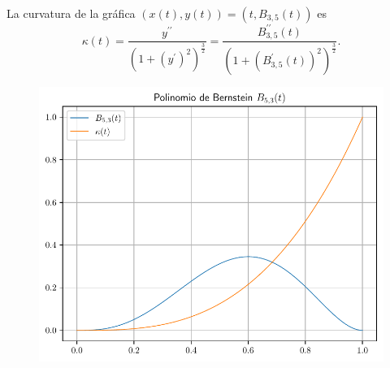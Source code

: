 \begin{frame}
\begin{solution}
        La curvatura de la gráfica
        \begin{math}
            \left(
            x\left(t\right),
            y\left(t\right)
            \right)=
            \left(
            t,
            B_{3,5}\left(t\right)
            \right)
        \end{math}
        es
        \begin{equation*}
            \kappa\left(t\right)=
            \dfrac{
                y^{\prime\prime}
            }{
                {\left(1+{\left(y^{\prime}\right)}^{2}\right)}^{\frac{3}{2}}
            }=
            \dfrac{
                B^{\prime\prime}_{3,5}\left(t\right)
            }{
                {\left(1+{\left(B^{\prime}_{3,5}\left(t\right)\right)}^{2}\right)}^{\frac{3}{2}}
            }.
        \end{equation*}
    \end{solution}
\end{frame}

\begin{frame}
    \begin{solution}
        \begin{figure}[ht!]
            \centering
            \includegraphics[width=.72\paperwidth]{p1}
        \end{figure}
    \end{solution}
\end{frame}